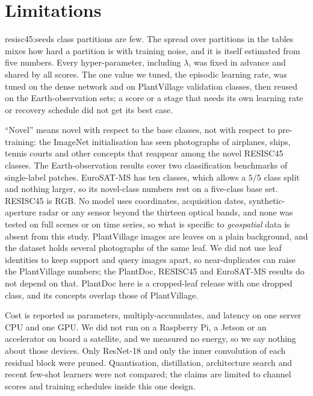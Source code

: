 \section{Limitations}
\label{sec:limits}

\num{resisc45:seeds} class partitions are few. The spread over partitions in the tables mixes how hard a partition is with training noise, and it is itself estimated from five numbers. Every hyper-parameter, including $\lambda$, was fixed in advance and shared by all scores. The one value we tuned, the episodic learning rate, was tuned on the dense network and on PlantVillage validation classes, then reused on the Earth-observation sets; a score or a stage that needs its own learning rate or recovery schedule did not get its best case. 

``Novel'' means novel with respect to the base classes, not with respect to pre-training: the ImageNet initialisation has seen photographs of airplanes, ships, tennis courts and other concepts that reappear among the novel RESISC45 classes. The Earth-observation results cover two classification benchmarks of single-label patches. EuroSAT-MS has ten classes, which allows a $5/5$ class split and nothing larger, so its novel-class numbers rest on a five-class base set. RESISC45 is RGB. No model uses coordinates, acquisition dates, synthetic-aperture radar or any sensor beyond the thirteen optical bands, and none was tested on full scenes or on time series, so what is specific to \emph{geospatial} data is absent from this study. PlantVillage images are leaves on a plain background, and the dataset holds several photographs of the same leaf. We did not use leaf identities to keep support and query images apart, so near-duplicates can raise the PlantVillage numbers; the PlantDoc, RESISC45 and EuroSAT-MS results do not depend on that. PlantDoc here is a cropped-leaf release with one dropped class, and its concepts overlap those of PlantVillage.

Cost is reported as parameters, multiply-accumulates, and latency on one server CPU and one GPU. We did not run on a Raspberry Pi, a Jetson or an accelerator on board a satellite, and we measured no energy, so we say nothing about those devices. Only ResNet-18 and only the inner convolution of each residual block were pruned. Quantisation, distillation, architecture search and recent few-shot learners were not compared; the claims are limited to channel scores and training schedules inside this one design.
